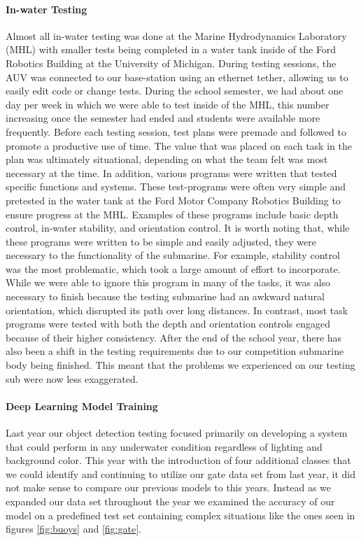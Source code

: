 \documentclass[conference]{IEEEtran}
\begin{document}
    \paragraph{In-water Testing}
    Almost all in-water testing was done at the Marine Hydrodynamics Laboratory (MHL) with smaller tests being completed in a water tank inside of the Ford Robotics Building at the University of Michigan. During testing sessions, the AUV was connected to our base-station using an ethernet tether, allowing us to easily edit code or change tests. During the school semester, we had about one day per week in which we were able to test inside of the MHL, this number increasing once the semester had ended and students were available more frequently. Before each testing session, test plans were premade and followed to promote a productive use of time. The value that was placed on each task in the plan was ultimately situational, depending on what the team felt was most necessary at the time. In addition, various programs were written that tested specific functions and systems. These test-programs were often very simple and pretested in the water tank at the Ford Motor Company Robotics Building to ensure progress at the MHL. Examples of these programs include basic depth control, in-water stability, and orientation control. It is worth noting that, while these programs were written to be simple and easily adjusted, they were necessary to the functionality of the submarine. For example, stability control was the most problematic, which took a large amount of effort to incorporate. While we were able to ignore this program in many of the tasks, it was also necessary to finish because the testing submarine had an awkward natural orientation, which disrupted its path over long distances. In contrast, most task programs were tested with both the depth and orientation controls engaged because of their higher consistency. After the end of the school year, there has also been a shift in the testing requirements due to our competition submarine body being finished. This meant that the problems we experienced on our testing sub were now less exaggerated.
    \paragraph{Deep Learning Model Training}
    
    Last year our object detection testing focused primarily on developing a system that could perform in any underwater condition regardless of lighting and background color. This year with the introduction of four additional classes that we could identify and continuing to utilize our gate data set from last year, it did not make sense to compare our previous models to this years. Instead as we expanded our data set throughout the year we examined the accuracy of our model on a predefined test set containing complex situations like the ones seen in figures \ref{fig:buoys} and \ref{fig:gate}.
   
\end{document}
